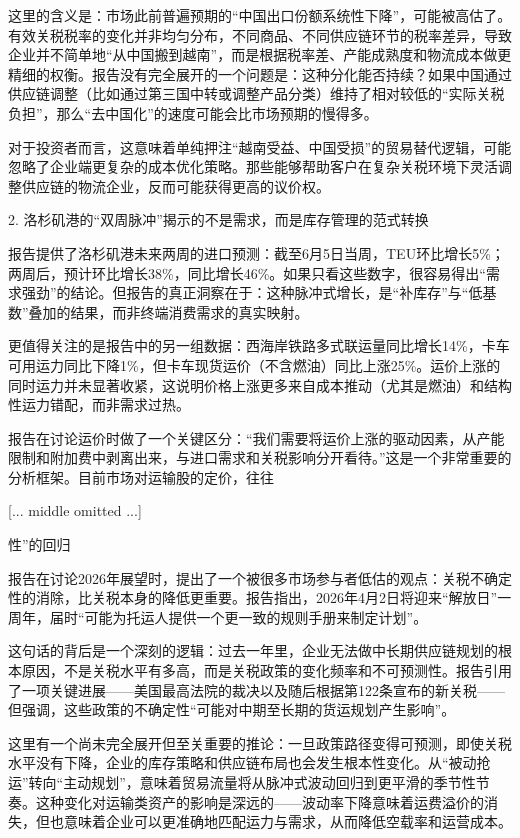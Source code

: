 \documentclass[11pt]{ctexart}
\begin{document}
这里的含义是：市场此前普遍预期的“中国出口份额系统性下降”，可能被高估了。有效关税税率的变化并非均匀分布，不同商品、不同供应链环节的税率差异，导致企业并不简单地“从中国搬到越南”，而是根据税率差、产能成熟度和物流成本做更精细的权衡。报告没有完全展开的一个问题是：这种分化能否持续？如果中国通过供应链调整（比如通过第三国中转或调整产品分类）维持了相对较低的“实际关税负担”，那么“去中国化”的速度可能会比市场预期的慢得多。

对于投资者而言，这意味着单纯押注“越南受益、中国受损”的贸易替代逻辑，可能忽略了企业端更复杂的成本优化策略。那些能够帮助客户在复杂关税环境下灵活调整供应链的物流企业，反而可能获得更高的议价权。

2. 洛杉矶港的“双周脉冲”揭示的不是需求，而是库存管理的范式转换

报告提供了洛杉矶港未来两周的进口预测：截至6月5日当周，TEU环比增长5\%；两周后，预计环比增长38\%，同比增长46\%。如果只看这些数字，很容易得出“需求强劲”的结论。但报告的真正洞察在于：这种脉冲式增长，是“补库存”与“低基数”叠加的结果，而非终端消费需求的真实映射。

更值得关注的是报告中的另一组数据：西海岸铁路多式联运量同比增长14\%，卡车可用运力同比下降1\%，但卡车现货运价（不含燃油）同比上涨25\%。运价上涨的同时运力并未显著收紧，这说明价格上涨更多来自成本推动（尤其是燃油）和结构性运力错配，而非需求过热。

报告在讨论运价时做了一个关键区分：“我们需要将运价上涨的驱动因素，从产能限制和附加费中剥离出来，与进口需求和关税影响分开看待。”这是一个非常重要的分析框架。目前市场对运输股的定价，往往

[... middle omitted ...]

性”的回归

报告在讨论2026年展望时，提出了一个被很多市场参与者低估的观点：关税不确定性的消除，比关税本身的降低更重要。报告指出，2026年4月2日将迎来“解放日”一周年，届时“可能为托运人提供一个更一致的规则手册来制定计划”。

这句话的背后是一个深刻的逻辑：过去一年里，企业无法做中长期供应链规划的根本原因，不是关税水平有多高，而是关税政策的变化频率和不可预测性。报告引用了一项关键进展——美国最高法院的裁决以及随后根据第122条宣布的新关税——但强调，这些政策的不确定性“可能对中期至长期的货运规划产生影响”。

这里有一个尚未完全展开但至关重要的推论：一旦政策路径变得可预测，即使关税水平没有下降，企业的库存策略和供应链布局也会发生根本性变化。从“被动抢运”转向“主动规划”，意味着贸易流量将从脉冲式波动回归到更平滑的季节性节奏。这种变化对运输类资产的影响是深远的——波动率下降意味着运费溢价的消失，但也意味着企业可以更准确地匹配运力与需求，从而降低空载率和运营成本。
\end{document}
